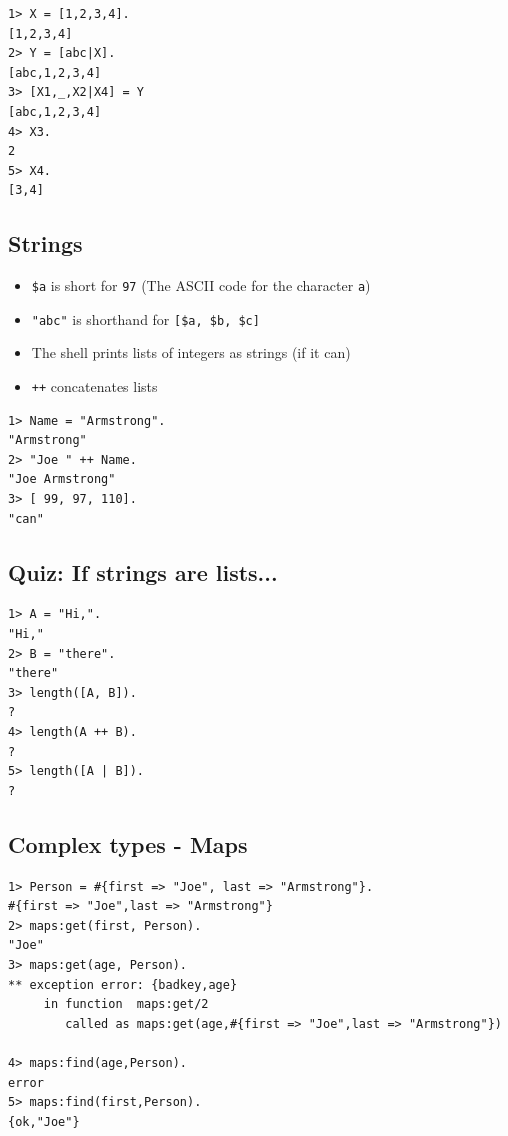 \documentclass[12pt]{article}
\begin{document}
\begin{verbatim}
1> X = [1,2,3,4].
[1,2,3,4]
2> Y = [abc|X].
[abc,1,2,3,4]
3> [X1,_,X2|X4] = Y
[abc,1,2,3,4]
4> X3.
2
5> X4.
[3,4]
\end{verbatim}


\subsection{Strings}

\begin{itemize}
\item \verb+$a+ is short for \verb+97+ (The ASCII code for the character \verb+a+)
\item \verb+"abc"+ is shorthand for \verb+[$a, $b, $c]+
\item The shell prints lists of integers as strings (if it can)
\item \verb|++| concatenates lists
\end{itemize}


\begin{verbatim}
1> Name = "Armstrong".
"Armstrong"
2> "Joe " ++ Name.
"Joe Armstrong"
3> [ 99, 97, 110].
"can"
\end{verbatim}

\subsection{Quiz: If strings are lists...}

\begin{verbatim}
1> A = "Hi,".
"Hi,"
2> B = "there".
"there"
3> length([A, B]).
?
4> length(A ++ B).
?
5> length([A | B]).
?
\end{verbatim}

\subsection{Complex types - Maps}

\begin{verbatim}
1> Person = #{first => "Joe", last => "Armstrong"}.
#{first => "Joe",last => "Armstrong"}
2> maps:get(first, Person).                        
"Joe"
3> maps:get(age, Person).  
** exception error: {badkey,age}
     in function  maps:get/2
        called as maps:get(age,#{first => "Joe",last => "Armstrong"})

4> maps:find(age,Person).
error
5> maps:find(first,Person).
{ok,"Joe"}
\end{verbatim}
\end{document}
